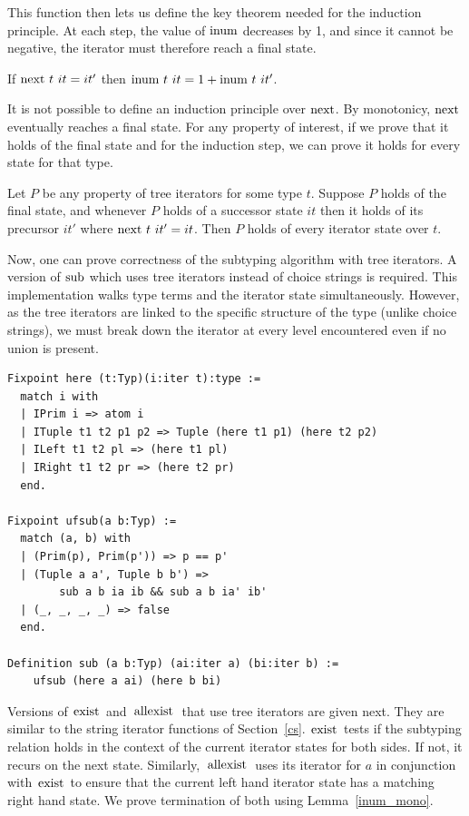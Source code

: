 \documentclass[a4paper,english]{lipics-v2019}
\renewcommand{\c}[1]{\ensuremath{\text{\lstinline{#1}}}\xspace}
\begin{document}
\noindent This function then lets us define the key theorem needed for the
induction principle. At each step, the value of \c{inum} decreases by 1, and
since it cannot be negative, the iterator must therefore reach a final
state.

\begin{lemma}[Monotonicity]\label{inum_mono}
If $\c{next}~t~it = it'$ then $\c{inum}~t~it = 1 + \c{inum}~t~it'$.
\end{lemma}

\noindent
It is not possible to define an induction principle over \c{next}. By
monotonicy, \c{next} eventually reaches a final state.  For any property
of interest, if we prove that it holds of the final state and for the
induction step, we can prove it holds for every state for that type.

\begin{theorem}\label{indprop}
Let $P$ be any property of tree iterators for some type $t$.  Suppose $P$
holds of the final state, and whenever $P$ holds of a successor state $it$
then it holds of its precursor $it'$ where $\c{next}~t~it' = it$.  Then $P$
holds of every iterator state over $t$.
\end{theorem} 

\noindent
Now, one can prove correctness of the subtyping algorithm with tree
iterators.  A version of \c{sub} which uses tree iterators instead of choice
strings is required.  This implementation walks type terms and the iterator
state simultaneously. However, as the tree iterators are linked to the
specific structure of the type (unlike choice strings), we must break down
the iterator at every level encountered even if no union is present.

\begin{lstlisting}
Fixpoint here (t:Typ)(i:iter t):type :=
  match i with
  | IPrim i => atom i
  | ITuple t1 t2 p1 p2 => Tuple (here t1 p1) (here t2 p2)
  | ILeft t1 t2 pl => (here t1 pl)
  | IRight t1 t2 pr => (here t2 pr)
  end.

Fixpoint ufsub(a b:Typ) :=
  match (a, b) with
  | (Prim(p), Prim(p')) => p == p'
  | (Tuple a a', Tuple b b') =>
        sub a b ia ib && sub a b ia' ib'
  | (_, _, _, _) => false
  end.

Definition sub (a b:Typ) (ai:iter a) (bi:iter b) :=
    ufsub (here a ai) (here b bi)
\end{lstlisting}

\noindent
Versions of \c{exist} and \c{allexist} that use tree iterators are given
next. They are similar to the string iterator functions of Section~\ref{cs}.
\c{exist} tests if the subtyping relation holds in the context of the
current iterator states for both sides. If not, it recurs on the next
state. Similarly, \c{allexist} uses its iterator for $a$ in conjunction with
\c{exist} to ensure that the current left hand iterator state has a matching
right hand state. We prove termination of both using Lemma~\ref{inum_mono}.
\end{document}
